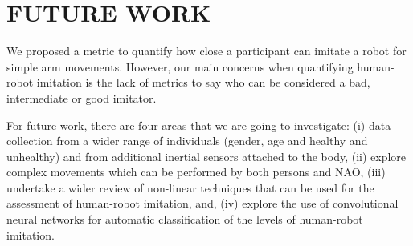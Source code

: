 \documentclass{sig-alternate-05-2015}
\begin{document}
\section{FUTURE WORK}
We proposed a metric to quantify how close a participant can imitate a robot for simple arm
movements. However, our main concerns when quantifying human-robot imitation
is the lack of metrics to say who can be considered a bad, intermediate or good imitator.

For future work, there are four areas that we are going to investigate:
(i) data collection from a wider range of individuals (gender, age and healthy and unhealthy)
and from additional inertial sensors attached to the body,
(ii) explore complex movements which can be performed by both persons and NAO,
(iii) undertake a wider review of non-linear techniques that can be used for 
the assessment of human-robot imitation, and, 
(iv) explore the use of convolutional neural networks for automatic 
classification of the levels of human-robot imitation.






%
%
\end{document}
